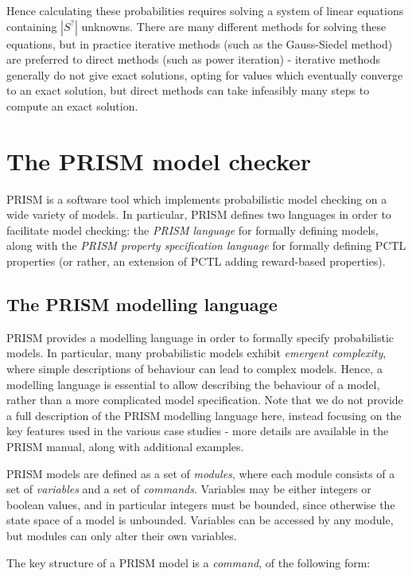 Hence calculating these probabilities requires solving a system of linear equations containing $|S^{?}|$ unknowns. There are many different methods for solving these equations, but in practice iterative methods (such as the Gauss-Siedel method) are preferred to direct methods (such as power iteration) - iterative methods generally do not give exact solutions, opting for values which eventually converge to an exact solution, but direct methods can take infeasibly many steps to compute an exact solution.

\section{The PRISM model checker}
\label{back:PRISM}

PRISM is a software tool which implements probabilistic model checking on a wide variety of models. In particular, PRISM defines two languages in order to facilitate model checking: the \emph{PRISM language} for formally defining models, along with the \emph{PRISM property specification language} for formally defining PCTL properties (or rather, an extension of PCTL adding reward-based properties).

\subsection{The PRISM modelling language}
\label{back:PRISM-modelling}

PRISM provides a modelling language in order to formally specify probabilistic models. In particular, many probabilistic models exhibit \emph{emergent complexity}, where simple descriptions of behaviour can lead to complex models. Hence, a modelling language is essential to allow describing the behaviour of a model, rather than a more complicated model specification. Note that we do not provide a full description of the PRISM modelling language here, instead focusing on the key features used in the various case studies - more details are available in the PRISM manual, along with additional examples.

PRISM models are defined as a set of \emph{modules}, where each module consists of a set of \emph{variables} and a set of \emph{commands}. Variables may be either integers or boolean values, and in particular integers must be bounded, since otherwise the state space of a model is unbounded. Variables can be accessed by any module, but modules can only alter their own variables.

The key structure of a PRISM model is a \emph{command}, of the following form:

